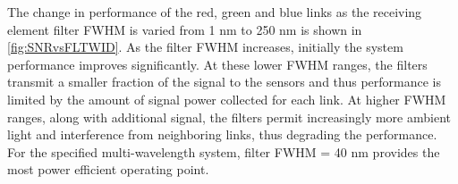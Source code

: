The change in performance of the red, green and blue links as the receiving element filter FWHM is varied from 1 nm to 250 nm is shown in \figurename{\ref{fig:SNRvsFLTWID}}. As the filter FWHM increases, initially the system performance improves significantly. At these lower FWHM ranges, the filters transmit a smaller fraction of the signal to the sensors and thus performance is limited by the amount of signal power collected for each link. At higher FWHM ranges, along with additional signal, the filters permit increasingly more ambient light and interference from neighboring links, thus degrading the performance. For the specified multi-wavelength system, filter FWHM = 40 nm provides the most power efficient operating point.









